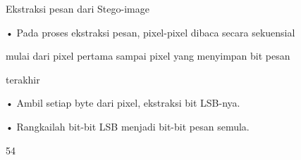 \documentclass{article}
\begin{document}

Ekstraksi pesan dari Stego-image

• Pada proses ekstraksi pesan, pixel-pixel dibaca secara sekuensial 

mulai dari pixel pertama sampai pixel yang menyimpan bit pesan 

terakhir 

• Ambil setiap byte dari pixel, ekstraksi bit LSB-nya. 

• Rangkailah bit-bit LSB menjadi bit-bit pesan semula.

54
\end{document}
